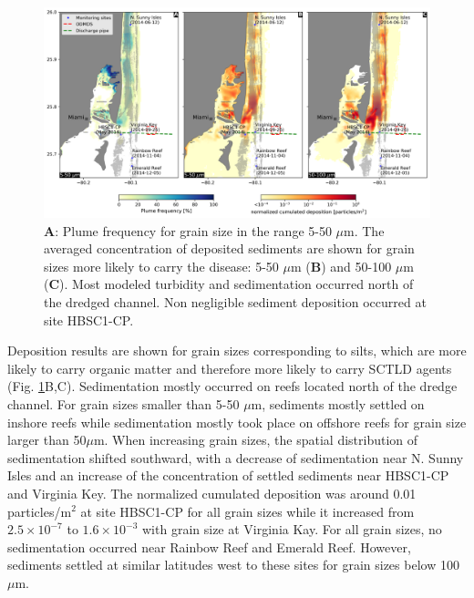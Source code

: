 \documentclass[preprint,12pt,authoryear]{elsarticle}
\begin{document}
\begin{figure}
    \centering
    \includegraphics[width=\textwidth]{figures/deposition_plumes.png}
    \caption{\textbf{A}: Plume frequency for grain size in the range 5-50 $\mu$m. The averaged concentration of deposited sediments are shown for grain sizes more likely to carry the disease: 5-50 $\mu$m (\textbf{B}) and 50-100 $\mu$m (\textbf{C}). Most modeled turbidity and sedimentation occurred north of the dredged channel. Non negligible sediment deposition occurred at site HBSC1-CP.}
    \label{fig:onset_depo}    
\end{figure}

Deposition results are shown for grain sizes corresponding to silts, which are more likely to carry organic matter and therefore more likely to carry SCTLD agents \citep{erftemeijer2012environmental}(Fig. \ref{fig:onset_depo}B,C). Sedimentation mostly occurred on reefs located north of the dredge channel. For grain sizes smaller than 5-50 $\mu$m, sediments mostly settled on inshore reefs while sedimentation mostly took place on offshore reefs for grain size larger than 50$\mu$m. When increasing grain sizes, the spatial distribution of sedimentation shifted southward, with a decrease of sedimentation near N. Sunny Isles and an increase of the concentration of settled sediments near HBSC1-CP and Virginia Key. The normalized cumulated deposition was around 0.01 particles/m$^2$ at site HBSC1-CP for all grain sizes while it increased from $2.5\times 10^{-7}$ to $1.6\times 10^{-3}$ with grain size at Virginia Kay. For all grain sizes, no sedimentation occurred near Rainbow Reef and Emerald Reef. However, sediments settled at similar latitudes west to these sites for grain sizes below 100 $\mu$m.
\end{document}
